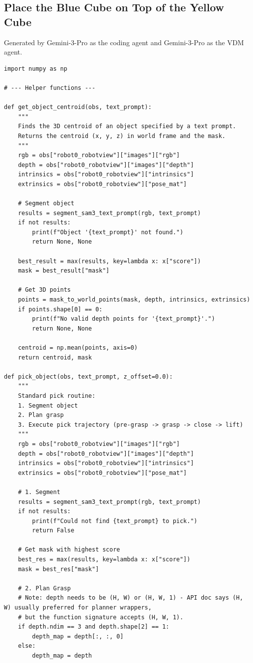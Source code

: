 \subsection{Place the Blue Cube on Top of the Yellow Cube}
\label{app:code_restack_real}
Generated by Gemini-3-Pro as the coding agent and Gemini-3-Pro as the VDM agent.
\begin{lstlisting}
import numpy as np

# --- Helper functions ---

def get_object_centroid(obs, text_prompt):
    """
    Finds the 3D centroid of an object specified by a text prompt.
    Returns the centroid (x, y, z) in world frame and the mask.
    """
    rgb = obs["robot0_robotview"]["images"]["rgb"]
    depth = obs["robot0_robotview"]["images"]["depth"]
    intrinsics = obs["robot0_robotview"]["intrinsics"]
    extrinsics = obs["robot0_robotview"]["pose_mat"]
    
    # Segment object
    results = segment_sam3_text_prompt(rgb, text_prompt)
    if not results:
        print(f"Object '{text_prompt}' not found.")
        return None, None
        
    best_result = max(results, key=lambda x: x["score"])
    mask = best_result["mask"]
    
    # Get 3D points
    points = mask_to_world_points(mask, depth, intrinsics, extrinsics)
    if points.shape[0] == 0:
        print(f"No valid depth points for '{text_prompt}'.")
        return None, None
        
    centroid = np.mean(points, axis=0)
    return centroid, mask

def pick_object(obs, text_prompt, z_offset=0.0):
    """
    Standard pick routine:
    1. Segment object
    2. Plan grasp
    3. Execute pick trajectory (pre-grasp -> grasp -> close -> lift)
    """
    rgb = obs["robot0_robotview"]["images"]["rgb"]
    depth = obs["robot0_robotview"]["images"]["depth"]
    intrinsics = obs["robot0_robotview"]["intrinsics"]
    extrinsics = obs["robot0_robotview"]["pose_mat"]

    # 1. Segment
    results = segment_sam3_text_prompt(rgb, text_prompt)
    if not results:
        print(f"Could not find {text_prompt} to pick.")
        return False
    
    # Get mask with highest score
    best_res = max(results, key=lambda x: x["score"])
    mask = best_res["mask"]

    # 2. Plan Grasp
    # Note: depth needs to be (H, W) or (H, W, 1) - API doc says (H, W) usually preferred for planner wrappers, 
    # but the function signature accepts (H, W, 1).
    if depth.ndim == 3 and depth.shape[2] == 1:
        depth_map = depth[:, :, 0]
    else:
        depth_map = depth


\end{lstlisting}
